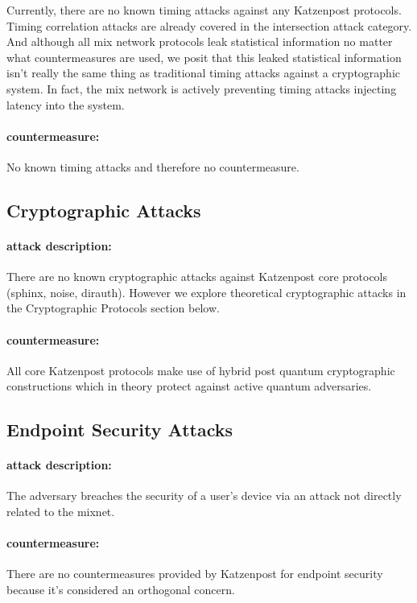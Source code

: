 \documentclass{article}
\begin{document}
Currently, there are no known timing attacks against any Katzenpost protocols.
Timing correlation attacks are already covered in the intersection
attack category. And although all mix network protocols leak statistical information no matter
what countermeasures are used, we posit that this leaked statistical information isn't really
the same thing as traditional timing attacks against a cryptographic system. In fact, the mix
network is actively preventing timing attacks injecting latency into the system.

\paragraph{countermeasure:} No known timing attacks and therefore no countermeasure.

\subsection{Cryptographic Attacks}

\paragraph{attack description:} There are no known cryptographic attacks against Katzenpost
core protocols (sphinx, noise, dirauth). However we explore theoretical cryptographic attacks
in the Cryptographic Protocols section below.

\paragraph{countermeasure:} All core Katzenpost protocols make use of hybrid post quantum cryptographic constructions which in theory protect against active quantum adversaries.

\subsection{Endpoint Security Attacks}

\paragraph{attack description:} The adversary breaches the security of a
user’s device via an attack not directly related to the mixnet.

\paragraph{countermeasure:} There are no countermeasures provided by Katzenpost for endpoint security because it's considered an orthogonal concern.
\end{document}
